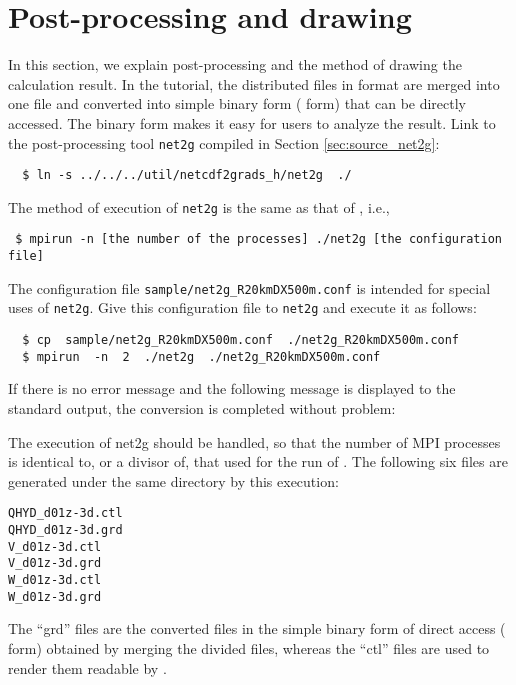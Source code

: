 \section{Post-processing and drawing} \label{sec:ideal_exp_net2g}
In this section, we explain post-processing and the method of drawing the calculation result.  In the tutorial, the distributed files in \netcdf format are merged into one file and converted into simple binary form ({\grads} form) that can be directly accessed. The binary form makes it easy for users to analyze the result. Link to the post-processing tool \verb|net2g| compiled  in Section \ref{sec:source_net2g}:
\begin{verbatim}
  $ ln -s ../../../util/netcdf2grads_h/net2g  ./
\end{verbatim}

The method of execution of \verb|net2g| is the same as that of \scalerm, i.e.,
\begin{verbatim}
 $ mpirun -n [the number of the processes] ./net2g [the configuration file]
\end{verbatim}
The configuration file \verb|sample/net2g_R20kmDX500m.conf| is intended for special uses of \verb|net2g|.
Give this configuration file to \verb|net2g| and execute it as follows:
\begin{verbatim}
  $ cp  sample/net2g_R20kmDX500m.conf  ./net2g_R20kmDX500m.conf
  $ mpirun  -n  2  ./net2g  ./net2g_R20kmDX500m.conf
\end{verbatim}
If there is no error message and the following message is displayed to the standard output,
the conversion is completed without problem:

The execution of net2g should be handled,
so that the number of MPI processes is identical to, or a divisor of, that used for the run of \scalerm. The following six files are generated under the same directory by this execution:
\begin{alltt}
  QHYD_d01z-3d.ctl
  QHYD_d01z-3d.grd
  V_d01z-3d.ctl
  V_d01z-3d.grd
  W_d01z-3d.ctl
  W_d01z-3d.grd
\end{alltt}
The ``grd'' files are the converted files in the simple binary form of direct access
({\grads} form) obtained by merging the divided files,
whereas the ``ctl'' files are used to render them readable by \grads.

